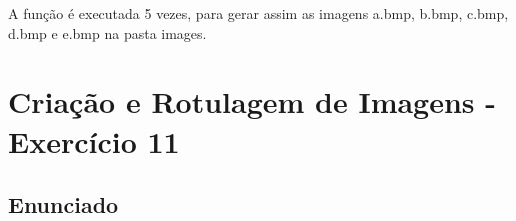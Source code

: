 \documentclass[10pt,a4paper]{article}
\begin{document}
\begin{flushleft}
A função é executada 5 vezes, para gerar assim as imagens a.bmp, b.bmp, c.bmp, d.bmp e e.bmp na pasta images.  
\end{flushleft}

\begin{figure}[H]
    \centering
    \qquad
    \qquad
    \qquad
    \qquad
\end{figure}

\pagebreak

\section{Criação e Rotulagem de Imagens - Exercício 11}

\subsection{Enunciado}
\end{document}
